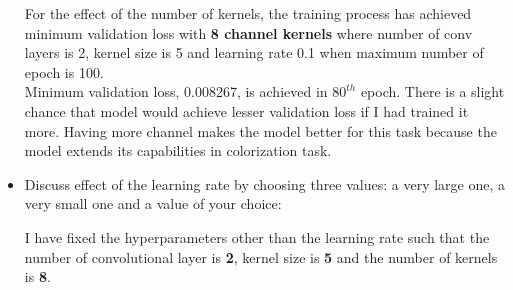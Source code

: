 \documentclass[12pt]{article}
\begin{document}
\begin{itemize}
		For the effect of the number of kernels, the training process has achieved minimum validation loss with \textbf{8 channel kernels} where number of conv layers is 2, kernel size is 5 and learning rate 0.1 when maximum number of epoch is 100. \\
		Minimum validation loss, 0.008267, is achieved in $80^{th}$ epoch. There is a slight chance that model would achieve lesser validation loss if I had trained it more. Having more channel makes the model better for this task because the model extends its capabilities in colorization task.
        
        \item Discuss effect of the learning rate by choosing three values: a very large one, a very small one and a value of your choice:
        
        I have fixed the hyperparameters other than the learning rate such that the number of convolutional layer is \textbf{2}, kernel size is \textbf{5} and the number of kernels is \textbf{8}.


\end{itemize}
\end{document}
